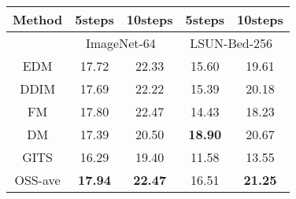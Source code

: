 \documentclass[10pt,twocolumn,letterpaper]{article}
\begin{document}
\begin{table}[H]
\centering
\vspace{-0.2cm}
\centering
\begin{tabular}{c|cc|cc} 
\toprule
\multicolumn{1}{c}{\textcolor[rgb]{0.2,0.2,0.2}{Method}} & \textcolor[rgb]{0.2,0.2,0.2}{5steps}          & \multicolumn{1}{c}{\textcolor[rgb]{0.2,0.2,0.2}{10steps}} & \textcolor[rgb]{0.2,0.2,0.2}{5steps}          & \textcolor[rgb]{0.2,0.2,0.2}{10steps}               \\ 
\hline
                                                         & \multicolumn{2}{c|}{\textcolor[rgb]{0.2,0.2,0.2}{ImageNet-64~\cite{russakovsky2015imagenet}}}                                         & \multicolumn{2}{c}{\textcolor[rgb]{0.2,0.2,0.2}{LSUN-Bed-256~\cite{yu2015lsun}}}  \\ 
\hline
\textcolor[rgb]{0.2,0.2,0.2}{EDM}                        & \textcolor[rgb]{0.2,0.2,0.2}{17.72}          & \textcolor[rgb]{0.2,0.2,0.2}{22.33}                      & \textcolor[rgb]{0.2,0.2,0.2}{15.60}          & \textcolor[rgb]{0.2,0.2,0.2}{19.61}                \\
\textcolor[rgb]{0.2,0.2,0.2}{DDIM}                       & \textcolor[rgb]{0.2,0.2,0.2}{17.69}          & \textcolor[rgb]{0.2,0.2,0.2}{22.22}                      & \textcolor[rgb]{0.2,0.2,0.2}{15.39}          & \textcolor[rgb]{0.2,0.2,0.2}{20.18}                \\
\textcolor[rgb]{0.2,0.2,0.2}{FM}                         & \textcolor[rgb]{0.2,0.2,0.2}{17.80}          & \textcolor[rgb]{0.2,0.2,0.2}{22.47}             & \textcolor[rgb]{0.2,0.2,0.2}{14.43}          & \textcolor[rgb]{0.2,0.2,0.2}{18.23}                \\
\textcolor[rgb]{0.2,0.2,0.2}{DM}                         & \textcolor[rgb]{0.2,0.2,0.2}{17.39}          & \textcolor[rgb]{0.2,0.2,0.2}{20.50}                      & \textcolor[rgb]{0.2,0.2,0.2}{\textbf{18.90}} & \textcolor[rgb]{0.2,0.2,0.2}{20.67}                \\
\textcolor[rgb]{0.2,0.2,0.2}{GITS}                       & \textcolor[rgb]{0.2,0.2,0.2}{16.29}          & \textcolor[rgb]{0.2,0.2,0.2}{19.40}                      & \textcolor[rgb]{0.2,0.2,0.2}{11.58}          & \textcolor[rgb]{0.2,0.2,0.2}{13.55}                \\
\textcolor[rgb]{0.2,0.2,0.2}{OSS-ave}                    & \textcolor[rgb]{0.2,0.2,0.2}{\textbf{17.94}} & \textcolor[rgb]{0.2,0.2,0.2}{\textbf{22.47}}             & \textcolor[rgb]{0.2,0.2,0.2}{16.51}          & \textcolor[rgb]{0.2,0.2,0.2}{\textbf{21.25}}       \\ 

\end{tabular}
\end{table}
\end{document}
